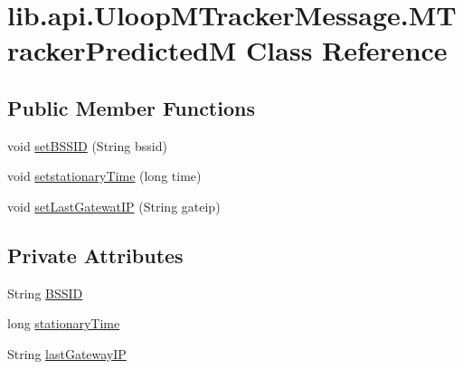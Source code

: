 \hypertarget{classlib_1_1api_1_1UloopMTrackerMessage_1_1MTrackerPredictedM}{\section{lib.\+api.\+Uloop\+M\+Tracker\+Message.\+M\+Tracker\+Predicted\+M Class Reference}
\label{classlib_1_1api_1_1UloopMTrackerMessage_1_1MTrackerPredictedM}
}
\subsection*{Public Member Functions}
\begin{DoxyCompactItemize}
\item 
void \hyperlink{classlib_1_1api_1_1UloopMTrackerMessage_1_1MTrackerPredictedM_a1c29c9403594c82d8564b2d63daf3bb2}{set\+B\+S\+S\+I\+D} (String bssid)
\item 
void \hyperlink{classlib_1_1api_1_1UloopMTrackerMessage_1_1MTrackerPredictedM_a70f81c2f1461a7b1232fc5fa41d18d62}{setstationary\+Time} (long time)
\item 
void \hyperlink{classlib_1_1api_1_1UloopMTrackerMessage_1_1MTrackerPredictedM_a2ef3674678bd15d7876af605bc73203f}{set\+Last\+Gatewat\+I\+P} (String gateip)
\end{DoxyCompactItemize}
\subsection*{Private Attributes}
\begin{DoxyCompactItemize}
\item 
String \hyperlink{classlib_1_1api_1_1UloopMTrackerMessage_1_1MTrackerPredictedM_ae63f95b7e7df89f62422c2d54683b1fc}{B\+S\+S\+I\+D}
\item 
long \hyperlink{classlib_1_1api_1_1UloopMTrackerMessage_1_1MTrackerPredictedM_a6fc77030c0afaee3814665d12815c532}{stationary\+Time}
\item 
String \hyperlink{classlib_1_1api_1_1UloopMTrackerMessage_1_1MTrackerPredictedM_a6b0813739dddddbec4008aff77f9c7fd}{last\+Gateway\+I\+P}
\end{DoxyCompactItemize}


